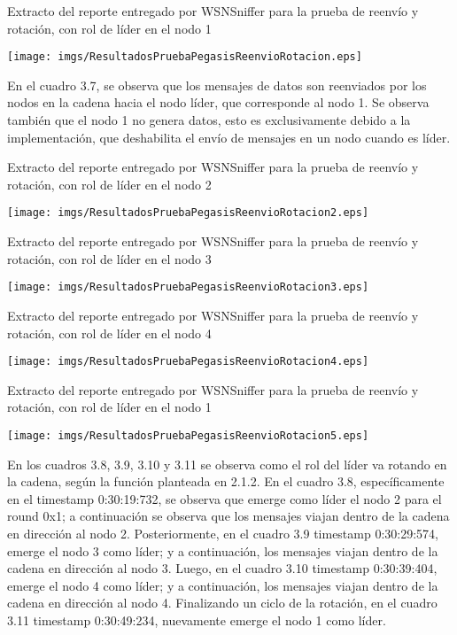 \begin{table}[H]
  \centering
  \caption{Extracto del reporte entregado por WSNSniffer para la prueba de reenvío y rotación, con rol de líder en el nodo 1 }
 \texttt{[image: imgs/ResultadosPruebaPegasisReenvioRotacion.eps]}
\end{table}

En el cuadro 3.7, se observa que los mensajes de datos son reenviados por los nodos en la cadena hacia el nodo líder, que corresponde al nodo 1. Se observa también que el nodo 1 no genera datos, esto es exclusivamente debido a la implementación, que deshabilita el envío de mensajes en un nodo cuando es líder.

\begin{table}[H]
  \centering
  \caption{Extracto del reporte entregado por WSNSniffer para la prueba de reenvío y rotación, con rol de líder en el nodo 2}
 \texttt{[image: imgs/ResultadosPruebaPegasisReenvioRotacion2.eps]}
\end{table}

\begin{table}[H]
  \centering
  \caption{Extracto del reporte entregado por WSNSniffer para la prueba de reenvío y rotación, con rol de líder en el nodo 3}
 \texttt{[image: imgs/ResultadosPruebaPegasisReenvioRotacion3.eps]}
\end{table}

\begin{table}[H]
  \centering
  \caption{Extracto del reporte entregado por WSNSniffer para la prueba de reenvío y rotación, con rol de líder en el nodo 4}
 \texttt{[image: imgs/ResultadosPruebaPegasisReenvioRotacion4.eps]}
 \end{table}
 
 \begin{table}[H]
  \centering
  \caption{Extracto del reporte entregado por WSNSniffer para la prueba de reenvío y rotación, con rol de líder en el nodo 1}
 \texttt{[image: imgs/ResultadosPruebaPegasisReenvioRotacion5.eps]}
 \end{table}
 
 En los cuadros 3.8, 3.9, 3.10 y 3.11 se observa como el rol del líder va rotando en la cadena, según  la función planteada en 2.1.2. En el cuadro 3.8, específicamente en el timestamp 0:30:19:732, se observa que emerge como líder el nodo 2 para el round 0x1; a continuación se observa que los mensajes viajan dentro de la cadena en dirección al nodo 2. Posteriormente, en el cuadro 3.9 timestamp 0:30:29:574, emerge el nodo 3 como líder; y a continuación, los mensajes viajan dentro de la cadena en dirección al nodo 3. Luego, en el cuadro 3.10 timestamp 0:30:39:404, emerge el nodo 4 como líder; y a continuación, los mensajes viajan dentro de la cadena en dirección al nodo 4. Finalizando un ciclo de la rotación, en el cuadro 3.11 timestamp 0:30:49:234, nuevamente emerge el nodo 1 como líder. 


